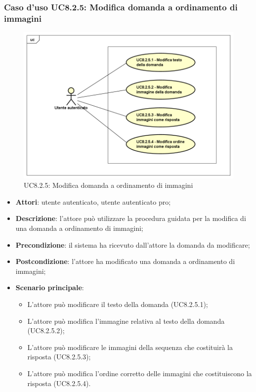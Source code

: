 \subsubsection{Caso d'uso UC8.2.5: Modifica domanda a ordinamento di immagini}
\label{UC8.2.5}
	\begin{figure}[ht]
		\centering
			\includegraphics[scale=0.45,keepaspectratio]{UML/UC8_2_5.png}
		\caption{UC8.2.5: Modifica domanda a ordinamento di immagini}
	\end{figure}
\begin{itemize}
	\item\textbf{Attori}: utente autenticato, utente autenticato pro;
	\item\textbf{Descrizione}: l'attore può utilizzare la procedura guidata per la modifica di una domanda a ordinamento di immagini;
	\item\textbf{Precondizione}: il sistema ha ricevuto dall'attore la domanda da modificare; 
	\item \textbf{Postcondizione}: l'attore ha modificato una domanda a ordinamento di immagini;
	\item\textbf{Scenario principale}: 
	\begin{itemize}
		\item L'attore può modificare il testo della domanda (UC8.2.5.1);
		\item L'attore può modifica l'immagine relativa al testo della domanda (UC8.2.5.2);
		\item L'attore può modificare le immagini della sequenza che costituirà la risposta (UC8.2.5.3);
		\item L'attore può modifica l'ordine corretto delle immagini che costituiscono la risposta (UC8.2.5.4).
	\end{itemize}
\end{itemize}


